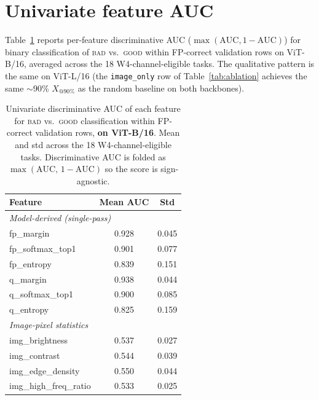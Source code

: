 \documentclass{article}
\makeatletter
\newcommand{\good}{\textsc{good}\xspace}
\newcommand{\bad}{\textsc{bad}\xspace}
\newcommand{\xat}[1]{\ensuremath{X_{@#1\%}}}
\makeatother
\begin{document}



\section{Univariate feature AUC}\label{app:univariate}

Table~\ref{tab:univariate} reports per-feature discriminative AUC (\(\max(\text{AUC},1-\text{AUC})\)) for binary classification of \bad{} vs.\ \good{} within FP-correct validation rows on ViT-B/16, averaged across the 18 W4-channel-eligible tasks. The qualitative pattern is the same on ViT-L/16 (the \texttt{image\_only} row of Table~\ref{tab:ablation} achieves the same $\sim$90\% \xat{90} as the random baseline on both backbones).

\begin{table}[t]
\centering
\caption{Univariate discriminative AUC of each feature for \bad{} vs.\ \good{} classification within FP-correct validation rows, \textbf{on ViT-B/16}. Mean and std across the 18 W4-channel-eligible tasks. Discriminative AUC is folded as $\max(\mathrm{AUC},\,1-\mathrm{AUC})$ so the score is sign-agnostic.}
\label{tab:univariate}
\small
\begin{tabular}{lcc}
\toprule
Feature & Mean AUC & Std \\
\midrule
\multicolumn{3}{l}{\textit{Model-derived (single-pass)}} \\
fp\_margin              & 0.928 & 0.045 \\
fp\_softmax\_top1       & 0.901 & 0.077 \\
fp\_entropy             & 0.839 & 0.151 \\
q\_margin               & 0.938 & 0.044 \\
q\_softmax\_top1        & 0.900 & 0.085 \\
q\_entropy              & 0.825 & 0.159 \\
\midrule
\multicolumn{3}{l}{\textit{Image-pixel statistics}} \\
img\_brightness         & 0.537 & 0.027 \\
img\_contrast           & 0.544 & 0.039 \\
img\_edge\_density      & 0.550 & 0.044 \\
img\_high\_freq\_ratio  & 0.533 & 0.025 \\
\bottomrule
\end{tabular}
\end{table}
\end{document}

